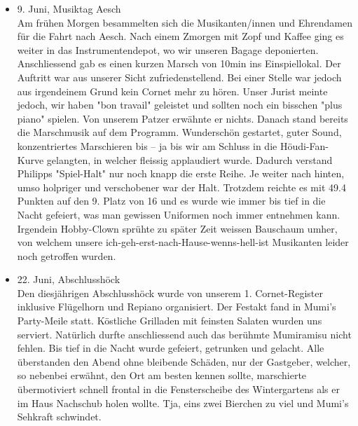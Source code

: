 \begin{history}
\begin{itemize}
        \item 9. Juni, Musiktag Aesch\\
              Am frühen Morgen besammelten sich die Musikanten/innen und Ehrendamen
              für die Fahrt nach Aesch. Nach einem Zmorgen mit Zopf und Kaffee ging es
              weiter in das Instrumentendepot, wo wir unseren Bagage deponierten.
              Anschliessend gab es einen kurzen Marsch von 10min ins Einspiellokal.
              Der Auftritt war aus unserer Sicht zufriedenstellend. Bei einer Stelle
              war jedoch aus irgendeinem Grund kein Cornet mehr zu hören. Unser Jurist
              meinte jedoch, wir haben "bon travail" geleistet und sollten noch ein
              bisschen "plus piano" spielen. Von unserem Patzer erwähnte er nichts.
              Danach stand bereits die Marschmusik auf dem Programm. Wunderschön
              gestartet, guter Sound, konzentriertes Marschieren bis -- ja bis wir am
              Schluss in die Höudi-Fan-Kurve gelangten, in welcher fleissig
              applaudiert wurde. Dadurch verstand Philipps "Spiel-Halt" nur noch knapp
              die erste Reihe. Je weiter nach hinten, umso holpriger und verschobener
              war der Halt. Trotzdem reichte es mit 49.4 Punkten auf den 9. Platz von
              16 und es wurde wie immer bis tief in die Nacht gefeiert, was man
              gewissen Uniformen noch immer entnehmen kann. Irgendein Hobby-Clown
              sprühte zu später Zeit weissen Bauschaum umher, von welchem unsere
              ich-geh-erst-nach-Hause-wenns-hell-ist Musikanten leider noch getroffen
              wurden.

        \item 22. Juni, Abschlusshöck\\
              Den diesjährigen Abschlusshöck wurde von unserem 1. Cornet-Register
              inklusive Flügelhorn und Repiano organisiert. Der Festakt fand in Mumi's
              Party-Meile statt. Köstliche Grilladen mit feinsten Salaten wurden uns
              serviert. Natürlich durfte anschliessend auch das berühmte Mumiramisu
              nicht fehlen. Bis tief in die Nacht wurde gefeiert, getrunken und
              gelacht. Alle überstanden den Abend ohne bleibende Schäden, nur der
              Gastgeber, welcher, so nebenbei erwähnt, den Ort am besten kennen
              sollte, marschierte übermotiviert schnell frontal in die Fensterscheibe
              des Wintergartens als er im Haus Nachschub holen wollte. Tja, eins zwei
              Bierchen zu viel und Mumi's Sehkraft schwindet.


\end{itemize}
\end{history}
